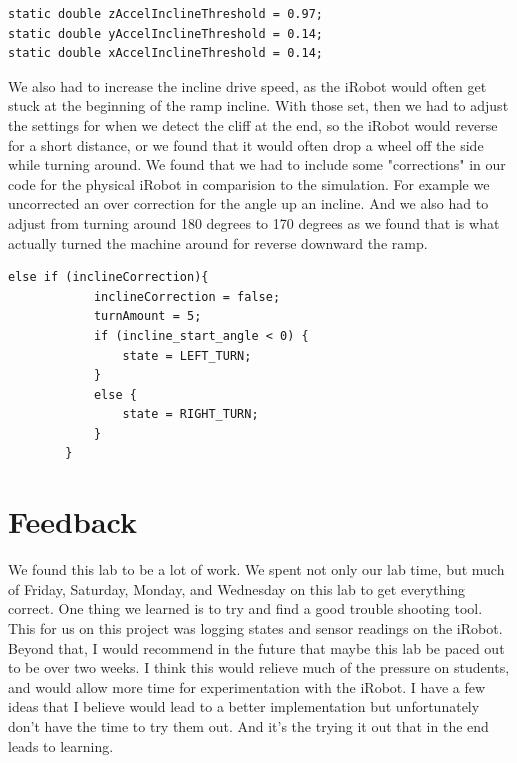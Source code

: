 \documentclass[twoside]{article}
\begin{document}
\vspace{-3mm}
\begin{lstlisting}[mathescape, frame=single]
static double zAccelInclineThreshold = 0.97;
static double yAccelInclineThreshold = 0.14;
static double xAccelInclineThreshold = 0.14;
\end{lstlisting}

\noindent We also had to increase the incline drive speed, as the iRobot would often get stuck at the beginning of the ramp incline. With those set, then we had to adjust the settings for when we detect the cliff at the end, so the iRobot would reverse for a short distance, or we found that it would often drop a wheel off the side while turning around. We found that we had to include some "corrections" in our code for the physical iRobot in comparision to the simulation. For example we uncorrected an over correction for the angle up an incline. And we also had to adjust from turning around 180 degrees to 170 degrees as we found that is what actually turned the machine around for reverse downward the ramp.

\vspace{-3mm}
\begin{lstlisting}[mathescape, frame=single]
 else if (inclineCorrection){
            inclineCorrection = false;
            turnAmount = 5;
            if (incline_start_angle < 0) {
                state = LEFT_TURN;
            }
            else {
                state = RIGHT_TURN;
            }
        }
\end{lstlisting}


\section{Feedback}

We found this lab to be a lot of work. We spent not only our lab time, but much of Friday, Saturday, Monday, and Wednesday on this lab to get everything correct. One thing we learned is to try and find a good trouble shooting tool. This for us on this project was logging states and sensor readings on the iRobot. Beyond that, I would recommend in the future that maybe this lab be paced out to be over two weeks. I think this would relieve much of the pressure on students, and would allow more time for experimentation with the iRobot. I have a few ideas that I believe would lead to a better implementation but unfortunately don't have the time to try them out. And it's the trying it out that in the end leads to learning.
\end{document}
